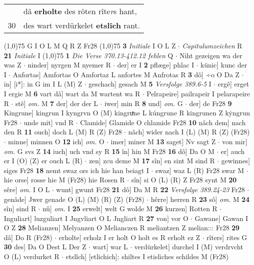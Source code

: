 \documentclass[8pt,a4paper,notitlepage]{article}
\begin{document}
\begin{table}[ht]
\begin{minipage}[t]{0.5\linewidth}
\begin{tabular}{rl}
 & dâ \textbf{erholte} des rôten rîte\textit{r}s hant,\\ 
30 & des wart verdürkelet \textbf{etslîch} rant.\\ 
\end{tabular}
\scriptsize
\line(1,0){75} \newline
G I O L M Q R Z Fr28 \newline
\line(1,0){75} \newline
\textbf{3} \textit{Initiale} I O L Z   $\cdot$ \textit{Capitulumzeichen} R  \textbf{21} \textit{Initiale} I  \newline
\line(1,0){75} \newline
\textbf{1} \textit{Die Verse 370.13-412.12 fehlen} Q   $\cdot$ Niht gezeigen wa der was Z  $\cdot$ ninder] nyrgen M nyemer R  $\cdot$ der] er I \textbf{2} pflæge] phlac I  $\cdot$ künic] kunc der I  $\cdot$ Anfortas] Amfortas O Amfortaz L anfortes M Anfrotas R \textbf{3} dô] ÷o O Da Z  $\cdot$ in] [i*]: in G im I L (M) Z  $\cdot$ geschach] gesach M \textbf{5} \textit{Versfolge 389.6-5} I   $\cdot$ ergê] erget I ergie M \textbf{6} vart dâ] wart da M wartent wa R  $\cdot$ Pelrapeire] pailrapeir I pelarapeire R  $\cdot$ stê] \textit{om.} M \textbf{7} der] der der L  $\cdot$ iwer] min R \textbf{8} und] \textit{om.} G  $\cdot$ der] de Fr28 \textbf{9} Kingrune] kingrun I kyngrvn O (M) kingruͯne L kúngrune R kingrunen Z kẏngrun Fr28  $\cdot$ unde mit] vnd R  $\cdot$ Clamide] Glamide O chlamide Fr28 \textbf{10} nâch dem] nach den R \textbf{11} ouch] doch L (M) R (Z) Fr28  $\cdot$ nâch] wider nach I (L) (M) R (Z) (Fr28)  $\cdot$ minne] minnen O \textbf{12} ich] \textit{om.} O  $\cdot$ imer] miner M \textbf{13} saget] Nv sagt Z  $\cdot$ von mir] \textit{om.} G svs Z \textbf{14} iuch] uch vnd sy R \textbf{15} în] hin M Fr28 \textbf{16} dô] Da O M  $\cdot$ er] auch er I (O) (Z) er ouch L (R)  $\cdot$ zen] zcu deme M \textbf{17} sîn] en sint M sind R  $\cdot$ gewinnes] siges Fr28 \textbf{18} nemt swaz ors ich hie han beiagt I  $\cdot$ swaz] waz L (R) Fr28 swar M  $\cdot$ hie orse] rosse hie M (Fr28) hie Rosen R  $\cdot$ sîn] si O (L) (R) Z Fr28 synt M \textbf{20} sêre] \textit{om.} I O L  $\cdot$ wunt] gwunt Fr28 \textbf{21} dô] Da M R \textbf{22} \textit{Versfolge 389.24-23} Fr28   $\cdot$ genâde] Jwer genade O (L) (M) (R) (Z) (Fr28)  $\cdot$ hêrre] herren R \textbf{23} sô] \textit{om.} M \textbf{24} sîn] sind R  $\cdot$ nû] \textit{om.} I \textbf{25} erwelt] welt G wolde M \textbf{26} kurzen] Rotten R  $\cdot$ Inguliart] luzguliart I Jngvliart O L Jngliart R \textbf{27} von] vor O  $\cdot$ Gawane] Gawan I O Z \textbf{28} Melianzen] Melyanzen O Melianczen R meliantzen Z melian::: Fr28 \textbf{29} dâ] Do R (Fr28)  $\cdot$ erholte] erholz I er holt O holt es R erholt ez Z  $\cdot$ rîters] rites G \textbf{30} des] Da O Dest L Der Z  $\cdot$ wart] war L  $\cdot$ verdürkelet] durchel I (M) verdrvcht O (L) verdurket R  $\cdot$ etslîch] [etlichich]: shiltes I etisliches schildes M (Fr28) \newline

\end{minipage}
\end{table}
\end{document}
